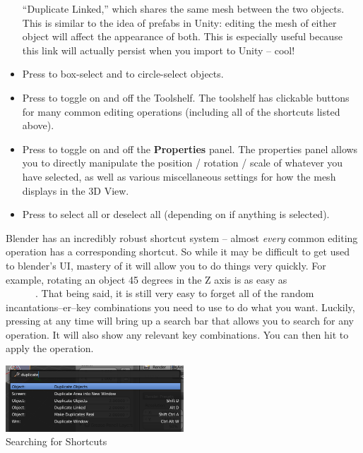 \documentclass[11pt]{article}
\begin{document}
\begin{itemize}
    ``Duplicate Linked,'' which shares the same mesh between the two objects.  This is similar to
    the idea of prefabs in Unity: editing the mesh of either object will affect the appearance of
    both.  This is especially useful because this link will actually persist when you import to
    Unity -- cool!
    \item Press  to box-select and  to circle-select objects.
    \item Press  to toggle on and off the Toolshelf.  The toolshelf has clickable buttons
    for many common editing operations (including all of the shortcuts listed above).
    \item Press  to toggle on and off the \textbf{Properties} panel.  The properties panel
    allows you to directly manipulate the position / rotation / scale of whatever you have selected,
    as well as various miscellaneous settings for how the mesh displays in the 3D View.
    \item Press  to select all or deselect all (depending on if anything is selected).
\end{itemize}

Blender has an incredibly robust shortcut system -- almost \textit{every} common editing operation
has a corresponding shortcut.  So while it may be difficult to get used to blender's UI, mastery of
it will allow you to do things very quickly.  For example, rotating an object 45 degrees in
the Z axis is as easy as \\ \faAngleRight\  \faAngleRight\  \faAngleRight\ 
 \faAngleRight\ \keys{\return}.  That being said, it is still very easy to forget all of the random 
incantations--er--key combinations you need to use to do what you want.  Luckily, pressing \keys{Space} at
any time will bring up a search bar that allows you to search for any operation.  It will also show any
relevant key combinations.  You can then hit \keys{\return} to apply the operation.
\begin{center}
    \vbox{
    \includegraphics[width=0.5\textwidth]{search-diag}\\
    Searching for Shortcuts}
\end{center}
\end{document}
